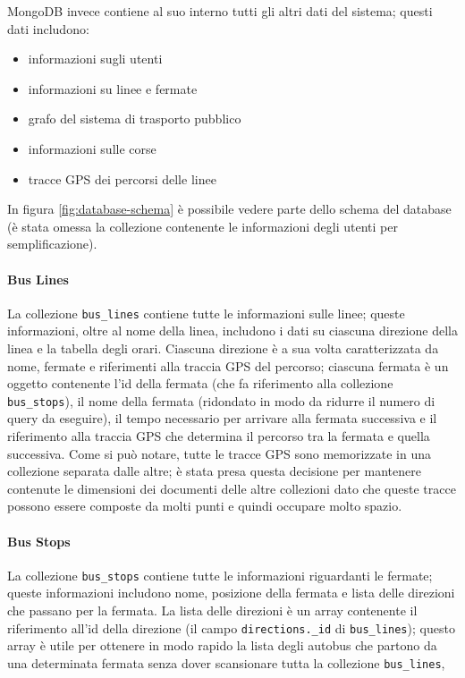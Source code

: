 MongoDB invece contiene al suo interno tutti gli altri dati del sistema; questi dati includono:
\begin{itemize}
    \item informazioni sugli utenti
    \item informazioni su linee e fermate
    \item grafo del sistema di trasporto pubblico
    \item informazioni sulle corse
    \item tracce GPS dei percorsi delle linee
\end{itemize}

In figura \ref{fig:database-schema} è possibile vedere parte dello schema del database (è stata omessa la collezione contenente le informazioni degli utenti per semplificazione).

\paragraph{Bus Lines} La collezione \verb|bus_lines| contiene tutte le informazioni sulle linee; queste informazioni, oltre al nome della linea, includono i dati su ciascuna direzione della linea e la tabella degli orari.
Ciascuna direzione è a sua volta caratterizzata da nome, fermate e riferimenti alla traccia GPS del percorso; ciascuna fermata è un oggetto contenente l'id della fermata (che fa riferimento alla collezione \verb|bus_stops|), il nome della fermata (ridondato in modo da ridurre il numero di query da eseguire), il tempo necessario per arrivare alla fermata successiva e il riferimento alla traccia GPS che determina il percorso tra la fermata e quella successiva.
Come si può notare, tutte le tracce GPS sono memorizzate in una collezione separata dalle altre; è stata presa questa decisione per mantenere contenute le dimensioni dei documenti delle altre collezioni dato che queste tracce possono essere composte da molti punti e quindi occupare molto spazio.

\paragraph{Bus Stops} La collezione \verb|bus_stops| contiene tutte le informazioni riguardanti le fermate; queste informazioni includono nome, posizione della fermata e lista delle direzioni che passano per la fermata.
La lista delle direzioni è un array contenente il riferimento all'id della direzione (il campo \verb|directions._id| di \verb|bus_lines|); questo array è utile per ottenere in modo rapido la lista degli autobus che partono da una determinata fermata senza dover scansionare tutta la collezione \verb|bus_lines|,

